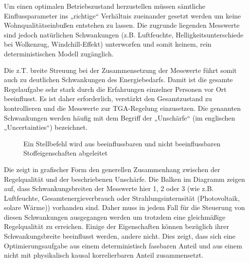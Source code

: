 Um einen optimalen Betriebszustand herzustellen müssen sämtliche Einflussparameter ins „richtige“ Verhältnis zueinander gesetzt werden um keine Wohnqualitätseinbußen entstehen zu lassen. Die zugrunde liegenden Messwerte sind jedoch natürlichen Schwankungen (z.B. Luftfeuchte, Helligkeitsunterschiede bei Wolkenzug, Windchill-Effekt) unterworfen und somit keinem, rein deterministischen Modell zugänglich.

Die z.T. breite Streuung bei der Zusammensetzung der Messwerte führt somit auch zu deutlichen Schwankungen des Energiebedarfs. Damit ist die gesamte Regelaufgabe sehr stark durch die Erfahrungen einzelner Personen vor Ort beeinflusst. Es ist daher erforderlich, verstärkt den Gesamtzustand zu kontrollieren und die Messwerte zur TGA-Regelung einzusetzen. Die genannten Schwankungen werden häufig mit dem Begriff der „Unschärfe“ (im englischen „Uncertainties“) bezeichnet.

\begin{figure}[htbp]
    \centering
    \caption{\label{fig-regel}Ein Stellbefehl wird aus beeinflussbaren und nicht beeinflussbaren Stoffeigenschaften abgeleitet}
\end{figure}

Die  zeigt in grafischer Form den generellen Zusammenhang zwischen der Regelqualität und der beschriebenen Unschärfe. Die Balken im Diagramm zeigen auf, dass Schwankungsbreiten der Messwerte hier 1, 2 oder 3 (wie z.B. Luftfeuchte, Gesamtenergieverbrauch oder Strahlungsinternsität (Photovoltaik, solare Wärme)) vorhanden sind. Daher muss in jedem Fall für die Steuerung von diesen Schwankungen ausgegangen werden um trotzdem eine gleichmäßige Regelqualität zu erreichen. Einige der Eigenschaften können bezüglich ihrer Schwankungsbreite beeinflusst werden, andere nicht. Dies zeigt, dass sich eine Optimierungsaufgabe aus einem deterministisch fassbaren Anteil und aus einem nicht mit physikalisch kausal korrelierbaren Anteil zusammensetzt.

